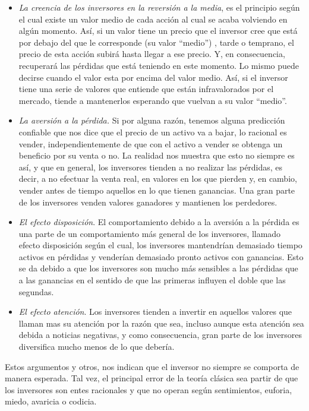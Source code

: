 \begin{itemize}
	\item \emph{La creencia de los inversores en la reversión a la media}, es el principio según el cual existe un valor medio de cada acción al cual se acaba volviendo en algún momento. Así, si un valor tiene un precio que el inversor cree que está por debajo del que le corresponde (su valor “medio”) , tarde o temprano, el precio de esta acción subirá hasta llegar a ese precio. Y, en consecuencia, recuperará las pérdidas que está teniendo en este momento. Lo mismo puede decirse cuando el valor esta por encima del valor medio. Así, si el inversor tiene una serie de valores que entiende que están infravalorados por el mercado, tiende a mantenerlos esperando que vuelvan a su valor “medio”.  	

	\item \emph{La aversión a la pérdida. } Si por alguna razón, tenemos alguna predicción confiable que nos dice que el precio de un activo va a bajar, lo racional es vender, independientemente de que con el activo a vender se obtenga un beneficio por su venta o no.
	La realidad nos muestra que esto no siempre es así, y que en general, los inversores tienden a no realizar las pérdidas, es decir, a no efectuar la venta real, en valores en los que pierden y, en cambio, vender antes de tiempo aquellos en lo que tienen ganancias. Una gran parte de los inversores venden valores ganadores y mantienen los perdedores.
	
	\item \emph{El efecto disposición}. El comportamiento debido a la aversión a la pérdida es una parte de un comportamiento más general de los inversores, llamado efecto disposición según el cual, los inversores mantendrían demasiado tiempo activos en pérdidas y venderían demasiado pronto activos con ganancias. Esto se da debido a que los inversores son mucho más sensibles a las pérdidas que a las ganancias en el sentido de que las primeras influyen el doble que las segundas.
	
	\item \emph{El efecto atención}. Los inversores tienden a invertir en aquellos valores que llaman mas su atención por la razón que sea, incluso aunque esta atención sea debida a noticias negativas, y como consecuencia, gran parte de los inversores diversifica mucho menos de lo que debería.
\end{itemize}

Estos argumentos y otros, nos indican que el inversor no siempre se comporta de manera esperada. Tal vez, el principal error de la teoría clásica sea partir de que los inversores son entes racionales y que no operan según sentimientos, euforia, miedo, avaricia o codicia.

